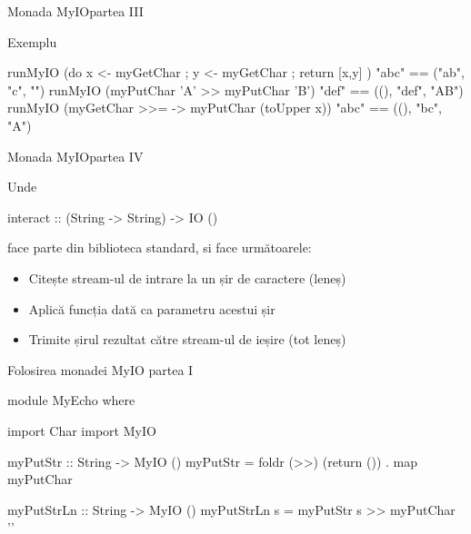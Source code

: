 \documentclass[xcolor=pdftex,romanian,colorlinks]{beamer}
\begin{document}
\begin{frame}[fragile]{Monada MyIO}{partea III}


\begin{block}
{Exemplu}
\vspace{-2ex}
\begin{asciihs}
runMyIO
  (do { x <- myGetChar ; y <- myGetChar ; return [x,y] } )
  "abc"
   == ("ab", "c", "")
runMyIO (myPutChar 'A' >> myPutChar 'B') "def"
   == ((), "def", "AB")
runMyIO (myGetChar >>= \x -> myPutChar (toUpper x)) "abc"
   == ((), "bc", "A")
\end{asciihs}
\end{block}

\end{frame}


%

\begin{frame}[fragile]{Monada MyIO}{partea IV}


Unde
\begin{asciihs}
   interact :: (String -> String) -> IO ()
\end{asciihs}
face parte din biblioteca standard, si face următoarele:
\begin{itemize}
\item Citește stream-ul de intrare la un șir de caractere (leneș)
\item Aplică funcția dată ca parametru acestui șir
\item Trimite șirul rezultat către stream-ul de ieșire (tot leneș)
\end{itemize}
\end{frame}


%
%


\begin{frame}[fragile]{Folosirea monadei MyIO}
{partea I}
\begin{asciihs}
  module MyEcho where

  import Char
  import MyIO

  myPutStr :: String -> MyIO ()
  myPutStr = foldr (>>) (return ()) . map myPutChar

  myPutStrLn :: String -> MyIO ()
  myPutStrLn s = myPutStr s >> myPutChar '\n'
\end{asciihs}
\end{frame}
\end{document}
